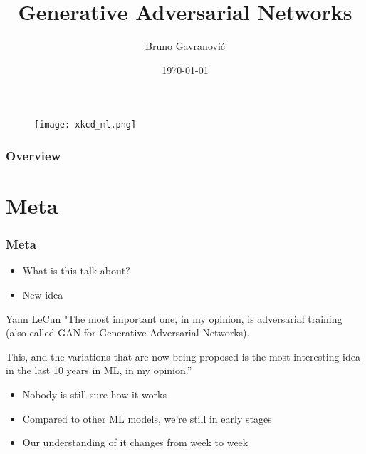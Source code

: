 \documentclass{Bredelebeamer}
\title[Generative Adversarial Networks]{Generative Adversarial Networks} %
\author{Bruno Gavranović} %
\institute[FER] %
{
IRB Seminar \\ %
\medskip
\textit{bruno.gavranovic@fer.hr} %
}
\date{\today} %
\begin{document}
\begin{frame}
	\begin{figure}[h!]
		\centering
		\texttt{[image: xkcd\_ml.png]}
	\end{figure}
\end{frame}

\begin{frame}
\titlepage %
\end{frame}

\begin{frame}
\frametitle{Overview} %
\tableofcontents %
\end{frame}


\section{Meta} %

\begin{frame} \frametitle{Meta}
\begin{itemize}[<+->]
	\item What is this talk about?
	\item New idea
\end{itemize}

\pause[3]
\begin{block}{Yann LeCun}
"The most important one, in my opinion, is adversarial training (also called GAN for Generative Adversarial Networks).

This, and the variations that are now being proposed is the most interesting idea in the last 10 years in ML, in my opinion.”
\end{block}

\begin{itemize}[<+(1)->]
	\item Nobody is still sure how it works
	\item Compared to other ML models, we're still in early stages
	\item Our understanding of it changes from week to week
\end{itemize}
\end{frame}
\end{document}
